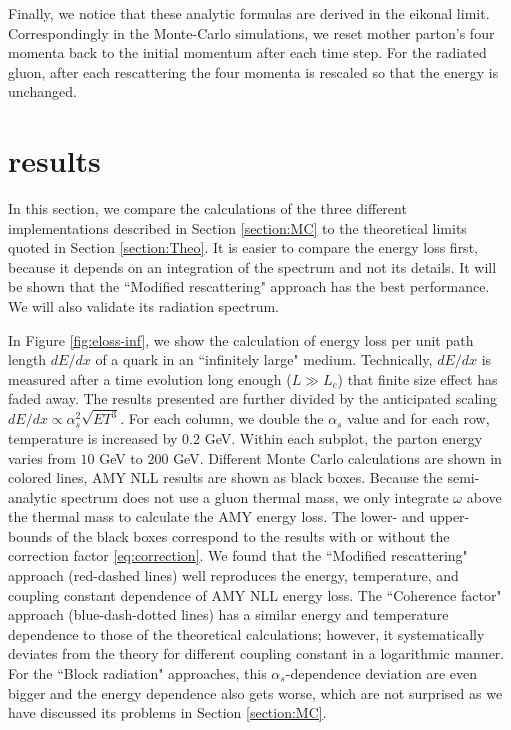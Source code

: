 \documentclass[aps, prc, reprint, amsmath, groupedaddress, nofootinbib]{revtex4-1}
\begin{document}
Finally, we notice that these analytic formulas are derived in the eikonal limit.
Correspondingly in the Monte-Carlo simulations, we reset mother parton's four momenta back to the initial momentum after each time step. 
For the radiated gluon, after each rescattering the four momenta is rescaled so that the energy is unchanged.



\section{results}\label{section:results}
In this section, we compare the calculations of the three different implementations described in Section \ref{section:MC} to the theoretical limits quoted in Section \ref{section:Theo}. 
It is easier to compare the energy loss first, because it depends on an integration of the spectrum and not its details.
It will be shown that the ``Modified rescattering" approach has the best performance. 
We will also validate its radiation spectrum.


In Figure \ref{fig:eloss-inf}, we show the calculation of energy loss per unit path length $dE/dx$ of a quark in an ``infinitely large" medium. 
Technically, $dE/dx$ is measured after a time evolution long enough ($L\gg L_c$) that finite size effect has faded away.
The results presented are further divided by the anticipated scaling $dE/dx \propto \alpha_s^2 \sqrt{ET^3}$.
For each column, we double the $\alpha_s$ value and for each row, temperature is increased by $0.2$ GeV. 
Within each subplot, the parton energy varies from $10$ GeV to $200$ GeV.
Different Monte Carlo calculations are shown in colored lines, AMY NLL results are shown as black boxes. 
Because the semi-analytic spectrum does not use a gluon thermal mass, we only integrate $\omega$ above the thermal mass to calculate the AMY energy loss. 
The lower- and upper-bounds of the black boxes correspond to the results with or without the correction factor \ref{eq:correction}.
We found that the ``Modified rescattering" approach (red-dashed lines) well reproduces the energy, temperature, and coupling constant dependence of AMY NLL energy loss.
The ``Coherence factor" approach (blue-dash-dotted lines) has a similar energy and temperature dependence to those of the theoretical calculations; however, it systematically deviates from the theory for different coupling constant in a logarithmic manner.
For the ``Block radiation" approaches, this $\alpha_s$-dependence deviation are even bigger and the energy dependence also gets worse, which are not surprised as we have discussed its problems in Section \ref{section:MC}.
\end{document}
